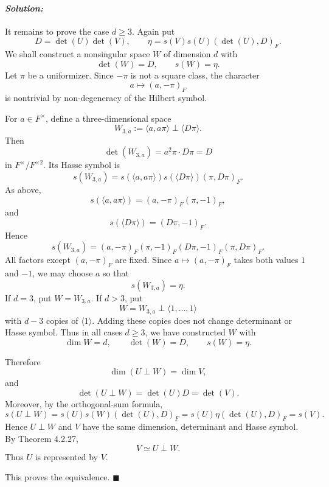 \documentclass[12pt, a4paper]{article}
\newenvironment{solution}
  {\paragraph{\textit{Solution:}}\par\medskip}
  {\hfill$\blacksquare$\vspace{0.1cm}}
\begin{document}
\begin{solution}
It remains to prove the case \(d\ge 3\). Again put
\[
D=\det(U)\det(V),
\qquad
\eta=s(V)s(U)(\det(U),D)_F.
\]
We shall construct a nonsingular space \(W\) of dimension \(d\) with
\[
\det(W)=D,\qquad s(W)=\eta.
\]
Let \(\pi\) be a uniformizer. Since \(-\pi\) is not a square class, the
character
\[
a\longmapsto (a,-\pi)_F
\]
is nontrivial by non-degeneracy of the Hilbert symbol.

For \(a\in F^\times\), define a three-dimensional space
\[
W_{3,a}:=\langle a,a\pi\rangle\perp \langle D\pi\rangle.
\]
Then
\[
\det(W_{3,a})=a^2\pi\cdot D\pi=D
\]
in \(F^\times/F^{\times 2}\). Its Hasse symbol is
\[
s(W_{3,a})
=s(\langle a,a\pi\rangle)s(\langle D\pi\rangle)(\pi,D\pi)_F.
\]
As above,
\[
s(\langle a,a\pi\rangle)=(a,-\pi)_F(\pi,-1)_F,
\]
and
\[
s(\langle D\pi\rangle)=(D\pi,-1)_F.
\]
Hence
\[
s(W_{3,a})
=(a,-\pi)_F(\pi,-1)_F(D\pi,-1)_F(\pi,D\pi)_F.
\]
All factors except \((a,-\pi)_F\) are fixed. Since
\(a\mapsto (a,-\pi)_F\) takes both values \(1\) and \(-1\), we may choose
\(a\) so that
\[
s(W_{3,a})=\eta.
\]
If \(d=3\), put \(W=W_{3,a}\). If \(d>3\), put
\[
W=W_{3,a}\perp \langle 1,\dots,1\rangle
\]
with \(d-3\) copies of \(\langle 1\rangle\). Adding these copies does not
change determinant or Hasse symbol. Thus in all cases \(d\ge 3\), we have
constructed \(W\) with
\[
\dim W=d,\qquad \det(W)=D,\qquad s(W)=\eta.
\]

Therefore
\[
\dim(U\perp W)=\dim V,
\]
and
\[
\det(U\perp W)=\det(U)D=\det(V).
\]
Moreover, by the orthogonal-sum formula,
\[
s(U\perp W)
=s(U)s(W)(\det(U),D)_F
=s(U)\eta(\det(U),D)_F
=s(V).
\]
Hence \(U\perp W\) and \(V\) have the same dimension, determinant and Hasse
symbol. By Theorem 4.2.27,
\[
V\simeq U\perp W.
\]
Thus \(U\) is represented by \(V\).

This proves the equivalence.
\end{solution}
\end{document}
